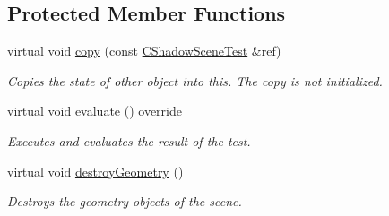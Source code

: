 \subsection*{Protected Member Functions}
\begin{DoxyCompactItemize}
\item 
\mbox{\label{class_unit_test_1_1_c_shadow_scene_test_afd720f7570eec5a8ba8aee5594beb197}} 
virtual void \mbox{\hyperlink{class_unit_test_1_1_c_shadow_scene_test_afd720f7570eec5a8ba8aee5594beb197}{copy}} (const \mbox{\hyperlink{class_unit_test_1_1_c_shadow_scene_test}{C\+Shadow\+Scene\+Test}} \&ref)
\begin{DoxyCompactList}\small\item\em Copies the state of other object into this. The copy is not initialized. \end{DoxyCompactList}\item 
\mbox{\label{class_unit_test_1_1_c_shadow_scene_test_ae6b447e587260d6c692f0a65cdd055ab}} 
virtual void \mbox{\hyperlink{class_unit_test_1_1_c_shadow_scene_test_ae6b447e587260d6c692f0a65cdd055ab}{evaluate}} () override
\begin{DoxyCompactList}\small\item\em Executes and evaluates the result of the test. \end{DoxyCompactList}\item 
\mbox{\label{class_unit_test_1_1_c_shadow_scene_test_a72a7c41ec3e71f43ed565da0745af6cc}} 
virtual void \mbox{\hyperlink{class_unit_test_1_1_c_shadow_scene_test_a72a7c41ec3e71f43ed565da0745af6cc}{destroy\+Geometry}} ()
\begin{DoxyCompactList}\small\item\em Destroys the geometry objects of the scene. \end{DoxyCompactList}\end{DoxyCompactItemize}
